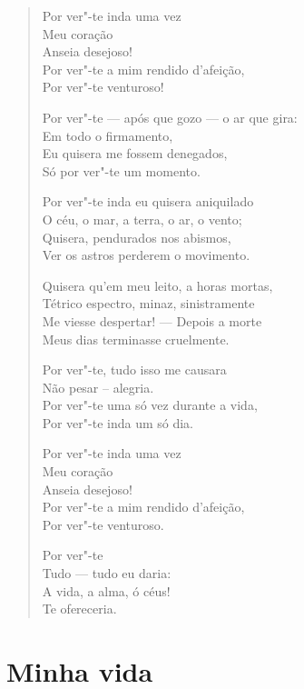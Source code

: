 \begin{verse}
Por ver"-te inda uma vez\\
\quad Meu coração\\
\quad Anseia desejoso!\\
Por ver"-te a mim rendido d'afeição,\\
Por ver"-te venturoso!

Por ver"-te --- após que gozo --- o ar que gira:\\
\quad Em todo o firmamento,\\
Eu quisera me fossem denegados,\\
\quad Só por ver"-te um momento.

Por ver"-te inda eu quisera aniquilado\\
O céu, o mar, a terra, o ar, o vento;\\
Quisera, pendurados nos abismos,\\
Ver os astros perderem o movimento.

Quisera qu'em meu leito, a horas mortas,\\
Tétrico espectro, minaz, sinistramente\\
Me viesse despertar! --- Depois a morte\\
Meus dias terminasse cruelmente.

Por ver"-te, tudo isso me causara\\
Não pesar ­-- alegria.\\
Por ver"-te uma só vez durante a vida,\\
\quad Por ver"-te inda um só dia.

Por ver"-te inda uma vez\\
\quad Meu coração\\
\quad Anseia desejoso!\\
Por ver"-te a mim rendido d'afeição,\\
Por ver"-te venturoso.

\quad Por ver"-te\\
Tudo --- tudo eu daria:\\
A vida, a alma, ó céus!\\
\quad Te ofereceria.
\end{verse}

\chapter{Minha vida}

